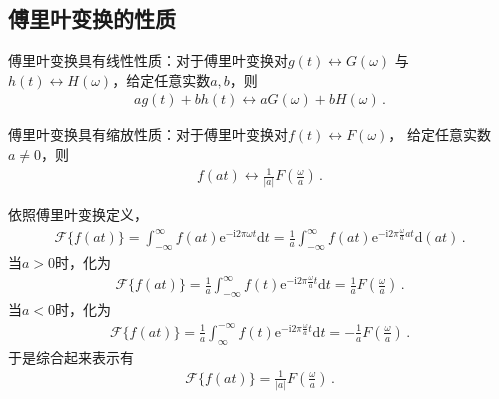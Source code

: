 \subsection{傅里叶变换的性质}\label{sub:傅里叶变换的性质}
\begin{theorem}
    傅里叶变换具有线性性质：对于傅里叶变换对$g(t)\leftrightarrow G(\omega)$
    与$h(t)\leftrightarrow H(\omega)$，给定任意实数$a,b$，则
    \begin{align}
        ag(t)+bh(t)\leftrightarrow aG(\omega)+bH(\omega)\, .
    \end{align}
\end{theorem}

\begin{theorem}
    傅里叶变换具有缩放性质：对于傅里叶变换对$f(t)\leftrightarrow F(\omega)$，
    给定任意实数$a\neq0$，则
    \begin{align}
        f(at)\leftrightarrow\frac{1}{|a|} F\left(\frac{\omega}{a}\right)\, .
    \end{align}
\end{theorem}
\begin{prove}
    依照傅里叶变换定义，
    \begin{align}\label{eq:7.ex01.scale}
        \mathcal{F}\{f(at)\}=\int_{-\infty}^{\infty}f(at)\mathrm{e}^{-\mathrm{i}2\pi\omega t}\mathrm{d}t
        =\frac{1}{a}\int_{-\infty}^{\infty}f(at)\mathrm{e}^{-\mathrm{i}2\pi\frac{\omega}{a}at}\mathrm{d}(at)\, .
    \end{align}
    当$a>0$时，化为
    \begin{align}
        \mathcal{F}\{f(at)\}=\frac{1}{a}\int_{-\infty}^{\infty}f(t)\mathrm{e}^{-\mathrm{i}2\pi\frac{\omega}{a}t}\mathrm{d}t
        =\frac{1}{a}F\left(\frac{\omega}{a}\right)\, .
    \end{align}
    当$a<0$时，化为
    \begin{align}
        \mathcal{F}\{f(at)\}=\frac{1}{a}\int_{\infty}^{-\infty}f(t)\mathrm{e}^{-\mathrm{i}2\pi\frac{\omega}{a}t}\mathrm{d}t
        =-\frac{1}{a}F\left(\frac{\omega}{a}\right)\, .
    \end{align}
    于是综合起来表示有
    \begin{align}
        \mathcal{F}\{f(at)\}=\frac{1}{|a|}F\left(\frac{\omega}{a}\right)\, .
    \end{align}
\end{prove}

